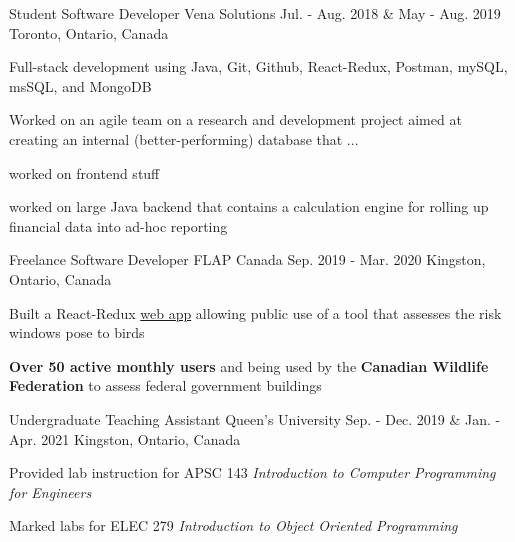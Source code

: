 \begin{cventries}
  \cventry
    {Student Software Developer} %
    {Vena Solutions} %
    {Jul. - Aug. 2018 \& May - Aug. 2019} %
    {Toronto, Ontario, Canada} %
    {
      \begin{cvitems} %
        \item {Full-stack development using Java, Git, Github, React-Redux, Postman, mySQL, msSQL, and MongoDB}
        \item{Worked on an agile team on a research and development project aimed at creating an internal (better-performing) database that ...}
        \item{worked on frontend stuff}
        \item{worked on large Java backend that contains a calculation engine for rolling up financial data into ad-hoc reporting}
      \end{cvitems}
    }

  \cventry
    {Freelance Software Developer} %
    {FLAP Canada} %
    {Sep. 2019 - Mar. 2020} %
    {Kingston, Ontario, Canada} %
    {
      \begin{cvitems} %
        \item {Built a React-Redux \href{https://www.flapapp.ca/}{web app} allowing public use of a tool that assesses the risk windows pose to birds}
        \item{\textbf{Over 50 active monthly users} and being used by the \textbf{Canadian Wildlife Federation} to assess federal government buildings}
      \end{cvitems}
    }

  \cventry
    {Undergraduate Teaching Assistant} %
    {Queen's University} %
    {Sep. - Dec. 2019 \& Jan. - Apr. 2021} %
    {Kingston, Ontario, Canada} %
    {
      \begin{cvitems} %
        \item{Provided lab instruction for APSC 143 \textit{Introduction to Computer Programming for Engineers}}
        \item{Marked labs for ELEC 279 \textit{Introduction to Object Oriented Programming}}
      \end{cvitems}
    }


\end{cventries}
